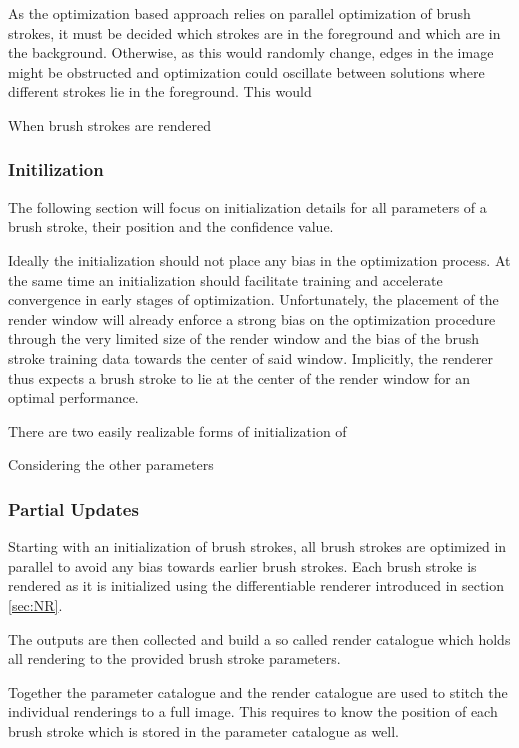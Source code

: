 As the optimization based approach relies on parallel optimization of brush strokes,
it must be decided which strokes are in the foreground and which are in the background.
Otherwise, as this would randomly change, edges in the image might be obstructed
and optimization could oscillate between solutions where different strokes lie in the
foreground.
This would

When brush strokes are rendered 



\subsubsection{Initilization}

The following section will focus on initialization details for all parameters of a
brush stroke, their position and the confidence value.

Ideally the initialization should not place any bias in the optimization process.
At the same time an initialization should facilitate training and accelerate convergence
in early stages of optimization.
Unfortunately, the placement of the render window will already enforce a strong bias
on the optimization procedure through the very limited size of the render window and
the bias of the brush stroke training data towards the center of said window.
Implicitly, the renderer thus expects a brush stroke to lie at the center of the render
window for an optimal performance.

There are two easily realizable forms of initialization of

Considering the other parameters

\subsubsection{Partial Updates}

Starting with an initialization of brush strokes, all brush strokes are optimized in
parallel to avoid any bias towards earlier brush strokes.
Each brush stroke is rendered as it is initialized using the differentiable renderer
introduced in section \ref{sec:NR}.

The outputs are then collected and build a so called render catalogue which holds
all rendering to the provided brush stroke parameters.

Together the parameter catalogue and the render catalogue are used to stitch the
individual renderings to a full image.
This requires to know the position of each brush stroke which is stored in the parameter
catalogue as well.
 
